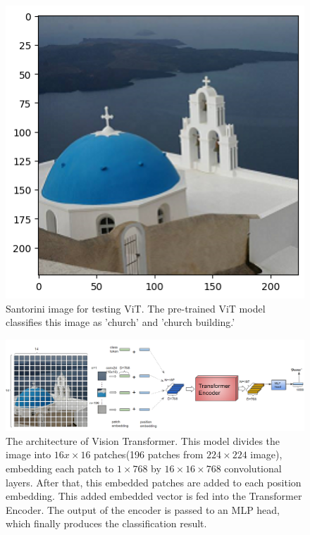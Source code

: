 \documentclass[extendedabs]{bmvc2k}
\begin{document}
\begin{figure}[t]
\centering
	\includegraphics[width=0.5\linewidth]{images/fig1.png}
	\caption{
		Santorini image for testing ViT. The pre-trained ViT model classifies this image as 'church' and 'church building.'}
	\vspace{-2mm}
\end{figure}

\begin{figure}[t]
\centering
	\includegraphics[width=\linewidth]{images/fig2.png}
	\caption{
		The architecture of Vision Transformer. This model divides the image into $16x\times16$ patches(196 patches from $224\times224$ image), embedding each patch to $1\times768$ by $16\times16\times768$ convolutional layers. After that, this embedded patches are added to each position embedding. This added embedded vector is fed into the Transformer Encoder. The output of the encoder is passed to an MLP head, which finally produces the classification result. }
	\vspace{-2mm}
    \label{vitarch}
\end{figure}
\end{document}
